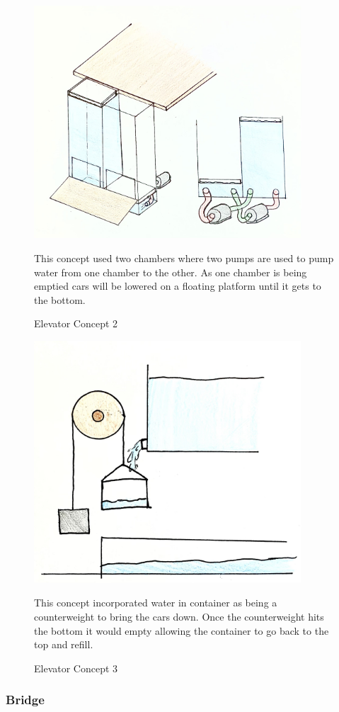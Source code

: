 \documentclass[fleqn,12pt]{project}
\begin{document}
\begin{figure}[h!]\centering
\includegraphics[width=10cm]{IMG_8474.jpg}
\caption{Elevator Concept 2}
This concept used two chambers where two pumps are used to pump water from one chamber to the other. As one chamber is being emptied cars will be lowered on a floating platform until it gets to the bottom.
\label{fig:Fig1}
\end{figure}

\begin{figure}[h!]\centering
\includegraphics[width=10cm]{IMG_8517.jpg}
\caption{Elevator Concept 3}
This concept incorporated water in container as being a counterweight to bring the cars down. Once the counterweight hits the bottom it would empty allowing the container to go back to the top and refill.
\label{fig:Fig1}
\end{figure}

\subsubsection{Bridge}
\end{document}
